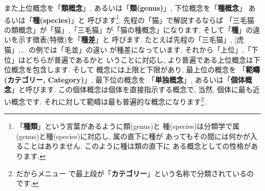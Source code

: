 \documentclass[b5j,8pt,twocolumn]{ltjsarticle}
\begin{document}
また上位概念を「\textbf{類概念}」, あるいは「\textbf{類(genus)}」,
 下位概念を「\textbf{種概念}」 あるいは「\textbf{種(species)}」と
呼びます\footnote{「\textbf{種類}」という言葉があるように類(genus)と
種(species)は分類学で属(genus)と種(species)に対応し, 属の直下に種が
あってもその間には何かが入ることはありません. このように種は類の直下に
ある概念としての性格があります.}. 先程の「猫」で解説するならば
「三毛猫の類概念」が「猫」,「三毛猫」が「猫の種概念」になります.
 そして「\textbf{種}」の違いを示す徴表(特徴)を「\textbf{種差}」と
呼びます. たとえば先程の「三毛猫」, [虎猫」,... の例では「毛並」の違い
が種差になっています. それから「上位」,「下位」はどちらが普遍であるかと
いうことに対応し, より普遍である上位概念は下位概念を包含します. そして
概念には上限と下限があり, 最上位の概念を
「\textbf{範疇(カテゴリー, Category)}」, 最下位の概念を
「\textbf{単独概念}」, あるいは「\textbf{個体概念}」と呼びます.
 この個体概念は個体を直接指示する概念で, 当然, 個体に最も近い概念です.
 それに対して範疇は最も普遍的な概念になります\footnote{だからメニュー
で最上段が「\textbf{カテゴリー}」という名称で分類されているのです.}.
\newline
\end{document}
